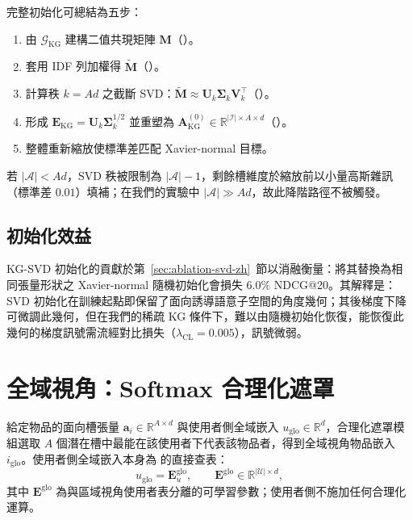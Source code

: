 完整初始化可總結為五步：

\begin{enumerate}
  \item 由 $\mathcal{G}_{\mathrm{KG}}$ 建構二值共現矩陣 $\mathbf{M}$（）。
  \item 套用 IDF 列加權得 $\tilde{\mathbf{M}}$（）。
  \item 計算秩 $k = A d$ 之截斷 SVD：$\tilde{\mathbf{M}} \approx \mathbf{U}_k \boldsymbol{\Sigma}_k \mathbf{V}_k^{\top}$（）。
  \item 形成 $\mathbf{E}_{\mathrm{KG}} = \mathbf{U}_k \boldsymbol{\Sigma}_k^{1/2}$ 並重塑為 $\mathbf{A}_{\mathrm{KG}}^{(0)} \in \mathbb{R}^{|\mathcal{I}| \times A \times d}$（）。
  \item 整體重新縮放使標準差匹配 Xavier-normal 目標。
\end{enumerate}

若 $|\mathcal{A}| < A d$，SVD 秩被限制為 $|\mathcal{A}| - 1$，剩餘槽維度於縮放前以小量高斯雜訊（標準差 $0.01$）填補；在我們的實驗中 $|\mathcal{A}| \gg A d$，故此降階路徑不被觸發。

\subsection{初始化效益}
\label{sec:kgsvd-effect-zh}

KG-SVD 初始化的貢獻於第~\ref{sec:ablation-svd-zh}~節以消融衡量：將其替換為相同張量形狀之 Xavier-normal 隨機初始化會損失 $6.0\%$ NDCG@20。其解釋是：SVD 初始化在訓練起點即保留了面向誘導語意子空間的角度幾何；其後梯度下降可微調此幾何，但在我們的稀疏 KG 條件下，難以由隨機初始化恢復，能恢復此幾何的梯度訊號需流經對比損失（$\lambda_{\mathrm{CL}} = 0.005$），訊號微弱。

\section{全域視角：Softmax 合理化遮罩}
\label{sec:softmax-zh}

給定物品的面向槽張量 $\mathbf{a}_i \in \mathbb{R}^{A \times d}$ 與使用者側全域嵌入 $u_{\mathrm{glo}} \in \mathbb{R}^d$，合理化遮罩模組選取 $A$ 個潛在槽中最能在該使用者下代表該物品者，得到全域視角物品嵌入 $i_{\mathrm{glo}}$。使用者側全域嵌入本身為  的直接查表：
\begin{equation}
\label{eq:uglo-lookup-zh}
u_{\mathrm{glo}} = \mathbf{E}^{\mathrm{glo}}_u, \qquad \mathbf{E}^{\mathrm{glo}} \in \mathbb{R}^{|\mathcal{U}| \times d},
\end{equation}
其中 $\mathbf{E}^{\mathrm{glo}}$ 為與區域視角使用者表分離的可學習參數；使用者側不施加任何合理化運算。

